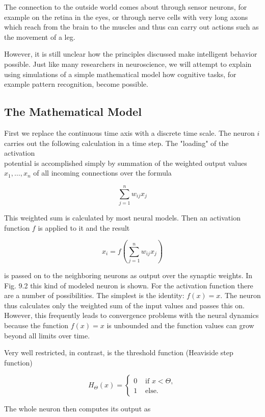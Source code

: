 \documentclass[10pt]{book}
\begin{document}
The connection to the outside world comes about through sensor neurons, for example on the retina in the eyes, or through nerve cells with very long axons which reach from the brain to the muscles and thus can carry out actions such as the movement of a leg.

However, it is still unclear how the principles discussed make intelligent behavior possible. Just like many researchers in neuroscience, we will attempt to explain using simulations of a simple mathematical model how cognitive tasks, for example pattern recognition, become possible.

\subsection{The Mathematical Model}
First we replace the continuous time axis with a discrete time scale. The neuron $i$ carries out the following calculation in a time step. The "loading" of the activation\\
potential is accomplished simply by summation of the weighted output values $x_{1}, \ldots, x_{n}$ of all incoming connections over the formula


$$
\sum_{j=1}^{n} w_{i j} x_{j}
$$

This weighted sum is calculated by most neural models. Then an activation function $f$ is applied to it and the result

$$
x_{i}=f\left(\sum_{j=1}^{n} w_{i j} x_{j}\right)
$$

is passed on to the neighboring neurons as output over the synaptic weights. In Fig. 9.2 this kind of modeled neuron is shown. For the activation function there are a number of possibilities. The simplest is the identity: $f(x)=x$. The neuron thus calculates only the weighted sum of the input values and passes this on. However, this frequently leads to convergence problems with the neural dynamics because the function $f(x)=x$ is unbounded and the function values can grow beyond all limits over time.

Very well restricted, in contrast, is the threshold function (Heaviside step function)

$$
H_{\Theta}(x)= \begin{cases}0 & \text { if } x<\Theta, \\ 1 & \text { else. }\end{cases}
$$

The whole neuron then computes its output as
\end{document}
